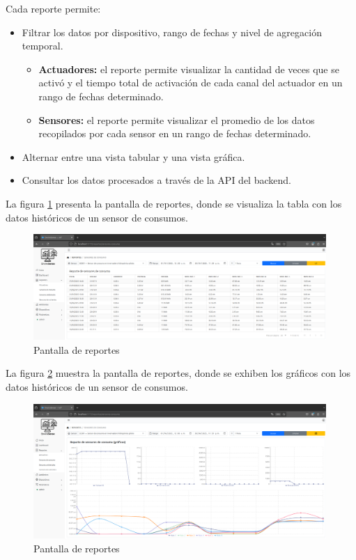 Cada reporte permite:
\begin{itemize}
    \item Filtrar los datos por dispositivo, rango de fechas y nivel de agregación
          temporal.
          \begin{itemize}
              \item \textbf{Actuadores:} el reporte permite visualizar la cantidad de veces que
                    se activó y el tiempo total de activación de cada canal del actuador en un
                    rango de fechas determinado.
              \item \textbf{Sensores:} el reporte permite visualizar el promedio de los datos
                    recopilados por cada sensor en un rango de fechas determinado.
          \end{itemize}
    \item Alternar entre una vista tabular y una vista gráfica.
    \item Consultar los datos procesados a través de la API del backend.
\end{itemize}

La figura \ref{fig:reportes_tabla_consumos} presenta la pantalla de reportes,
donde se visualiza la tabla con los datos históricos de un sensor de consumos.

\begin{figure}[H]
    \centering
    \includegraphics[width=0.99\textwidth]{./Images/28_reportes_1.png}
    \caption{Pantalla de reportes}
    \label{fig:reportes_tabla_consumos}
\end{figure}

La figura \ref{fig:reportes_graficos_consumos} muestra la pantalla de reportes,
donde se exhiben los gráficos con los datos históricos de un sensor de
consumos.

\begin{figure}[H]
    \centering
    \includegraphics[width=0.99\textwidth]{./Images/28_reportes_2.png}
    \caption{Pantalla de reportes}
    \label{fig:reportes_graficos_consumos}
\end{figure}

